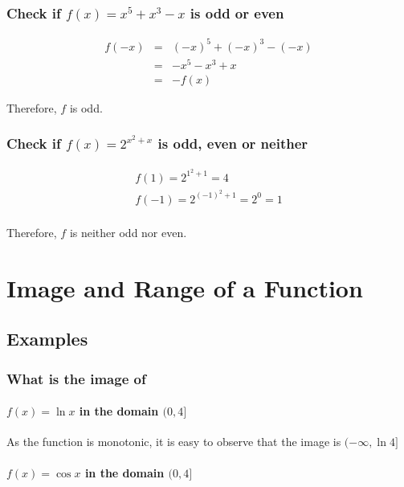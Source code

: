 \documentclass[fleqn]{article}
\begin{document}
\subsubsection{Check if $f(x) = x^5 + x^3 - x$ is odd or even}

\begin{align*}
	f(-x) &=& (-x)^5 + (-x)^3 - (-x)\\
	&=& -x^5 - x^3 +x\\
	&=& -f(x)
\end{align*}

Therefore, $f$ is odd.\\

\subsubsection{Check if $f(x) = 2^{x^2 +x}$ is odd, even or neither}

\begin{align*}
	f(1) = 2^{1^2 + 1} = 4\\
	f(-1) = 2^{(-1)^2 +1} = 2^0 = 1\\
\end{align*}

Therefore, $f$ is neither odd nor even.\\

\newpage
\section{Image and Range of a Function}

\subsection{Examples}

\subsubsection{What is the image of}

\paragraph{$f(x) = \ln x$ in the domain $(0, 4]$\\}

As the function is monotonic, it is easy to observe that the image is $(-\infty, \ln 4]$

\paragraph{$f(x) = \cos x$ in the domain $(0, 4]$\\}
\end{document}
